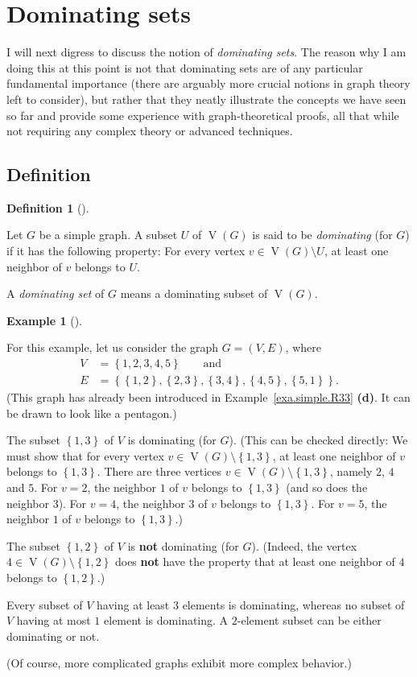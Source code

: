 \documentclass[numbers=enddot,12pt,final,onecolumn,notitlepage]{scrartcl}%
\theoremstyle{definition}
\newtheorem{defi}[theo]{Definition}
\newenvironment{definition}[1][]
{\begin{defi}[#1]\begin{leftbar}}
{\end{leftbar}\end{defi}}
\newtheorem{exam}[theo]{Example}
\newenvironment{example}[1][]
{\begin{exam}[#1]\begin{leftbar}}
{\end{leftbar}\end{exam}}
\newcommand{\set}[1]{\left\{ #1 \right\}}
\newcommand{\tup}[1]{\left( #1 \right)}
\newcommand{\verts}[1]{\operatorname{V}\left( #1 \right)}
\begin{document}
\section{\label{sect.dominating}Dominating sets}

I will next digress to discuss the notion of \textit{dominating sets}.
The reason why I am doing this at this point is not that dominating
sets are of any particular fundamental importance (there are arguably
more crucial notions in graph theory left to consider), but rather
that they neatly illustrate the concepts we have seen so far and
provide some experience with graph-theoretical proofs, all that while
not requiring any complex theory or advanced techniques.

\subsection{\label{subsect.dominating.defs}Definition}

\begin{definition} \label{def.dominating}
Let $G$ be a simple graph. A subset $U$ of $\verts{G}$ is said to be
\textit{dominating} (for $G$) if it has the following property: For
every vertex $v \in \verts{G} \setminus U$, at least one neighbor of
$v$ belongs to $U$.

A \textit{dominating set} of $G$ means a dominating subset of
$\verts{G}$.
\end{definition}

\begin{example} \label{exa.dominating.pentagon}
For this example, let us consider the graph $G = \tup{V, E}$, where
\begin{align*}
V &= \set{1, 2, 3, 4, 5} \qquad \text{and} \\
E &= \set{\set{1,2}, \set{2,3}, \set{3,4}, \set{4,5}, \set{5,1}} .
\end{align*}
(This graph has already been introduced in
Example~\ref{exa.simple.R33} \textbf{(d)}. It can be drawn to look
like a pentagon.)

The subset $\set{1, 3}$ of $V$ is dominating (for $G$). (This can be
checked directly: We must show that
for every vertex $v \in \verts{G} \setminus \set{1, 3}$, at least
one neighbor of $v$ belongs to $\set{1, 3}$. There are three vertices
$v \in \verts{G} \setminus \set{1, 3}$, namely $2$, $4$ and $5$. For
$v = 2$, the neighbor $1$ of $v$ belongs to $\set{1, 3}$ (and so does
the neighbor $3$). For $v = 4$, the neighbor $3$ of $v$ belongs to
$\set{1, 3}$. For $v = 5$, the neighbor $1$ of $v$ belongs to
$\set{1, 3}$.)

The subset $\set{1, 2}$ of $V$ is \textbf{not} dominating (for $G$).
(Indeed, the vertex $4 \in \verts{G} \setminus \set{1, 2}$ does
\textbf{not} have the property that at least one neighbor of $4$
belongs to $\set{1, 2}$.)

Every subset of $V$ having at least $3$ elements is dominating,
whereas no subset of $V$ having at most $1$ element is dominating.
A $2$-element subset can be either dominating or not.

(Of course, more complicated graphs exhibit more complex behavior.)
\end{example}
\end{document}

